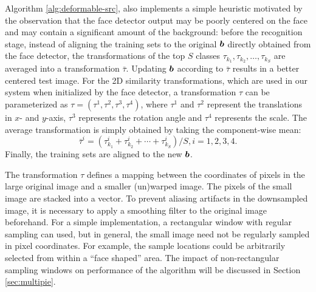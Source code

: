 Algorithm \ref{alg:deformable-src}, also implements a simple heuristic
motivated by the observation that the face detector output may be poorly
centered on the face and may contain a significant amount of the background:
before the recognition stage, instead of aligning the training sets to the
original $\boldsymbol{b}$ directly obtained from the face detector, the transformations of
the top $S$ classes $\tau_{k_1}, \tau_{k_2}, \ldots, \tau_{k_S}$ are averaged
into a transformation $\bar{\tau}$.  Updating $\boldsymbol{b}$ according to $\bar{\tau}$
results in a better centered test image. For the 2D similarity transformations,
which are used in our system when initialized by the face detector, a
transformation $\tau$ can be parameterized as $\tau = (\tau^1, \tau^2, \tau^3,
\tau^4)$, where $\tau^1$ and $\tau^2$ represent the translations in $x$- and
$y$-axis, $\tau^3$ represents the rotation angle and $\tau^4$ represents the
scale. The average transformation is simply obtained by taking the
component-wise mean:
\begin{displaymath}
\bar{\tau}^i = (\tau_{k_1}^i + \tau_{k_2}^i + \cdots +
\tau_{k_S}^i) / S, i = 1,2,3,4.
\end{displaymath}
Finally, the training sets are aligned to the new $\boldsymbol{b}$.



The transformation $\tau$ defines a mapping between the coordinates of pixels
in the large original image and a smaller (un)warped image. The pixels of the
small image are stacked into a vector. To prevent aliasing artifacts in the
downsampled image, it is necessary to apply a smoothing filter to the original
image beforehand. For a simple implementation, a rectangular window with
regular sampling can used, but in general, the small image need not be
regularly sampled in pixel coordinates.  For example, the sample locations
could be arbitrarily selected from within a ``face shaped'' area. The impact of
non-rectangular sampling windows on performance of the algorithm will be
discussed in Section \ref{sec:multipie}.

